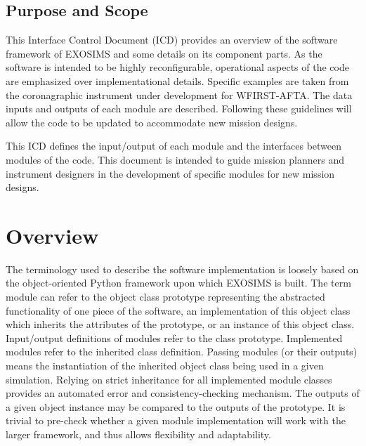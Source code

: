 \documentclass[cleanfoot]{asme2ej}
\begin{document}
\subsection{Purpose and Scope} %
This Interface Control Document (ICD) provides an overview of the software framework of EXOSIMS and some details on its component parts.  As the software is intended to be highly reconfigurable, operational aspects of the code are emphasized over implementational details.  Specific examples are taken from the coronagraphic instrument under development for WFIRST-AFTA.  The data inputs and outputs of each module are described. Following these guidelines will allow the code to be updated to accommodate new mission designs.

This ICD defines the input/output of each module and the interfaces between modules of the code.  This document is intended to guide mission planners and instrument designers in the development of specific modules for new mission designs.



\section{Overview}
The terminology used to describe the software implementation is loosely based on the object-oriented Python framework upon which EXOSIMS is built.  The term module can refer to the object class prototype representing the abstracted functionality of one piece of the software, an implementation of this object class which inherits the attributes of the prototype, or an instance of this object class.  Input/output definitions of modules refer to the class prototype.  Implemented modules refer to the inherited class definition.  Passing modules (or their outputs) means the instantiation of the inherited object class being used in a given simulation.  Relying on strict inheritance for all implemented module classes provides an automated error and consistency-checking mechanism.  The outputs of a given object instance may be compared to the outputs of the prototype.  It is trivial to pre-check whether a given module implementation will work with the larger framework, and thus allows flexibility and adaptability.
\end{document}
